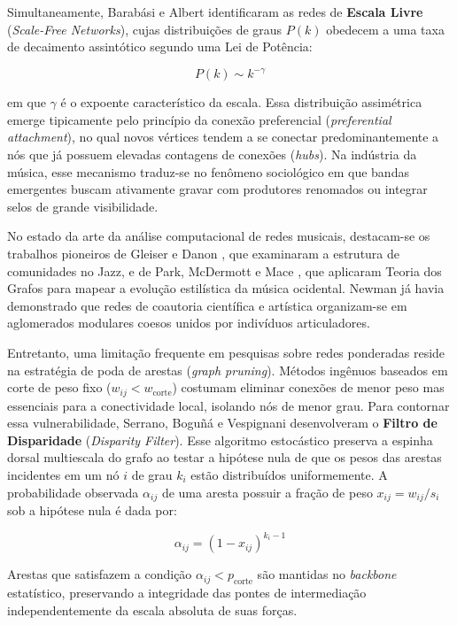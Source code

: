 \documentclass[conference]{IEEEtran}
\begin{document}
Simultaneamente, Barabási e Albert \cite{barabasi1999} identificaram as redes de \textbf{Escala Livre} (\textit{Scale-Free Networks}), cujas distribuições de graus $P(k)$ obedecem a uma taxa de decaimento assintótico segundo uma Lei de Potência:

\begin{equation}
P(k) \sim k^{-\gamma}
\end{equation}

em que $\gamma$ é o expoente característico da escala. Essa distribuição assimétrica emerge tipicamente pelo princípio da conexão preferencial (\textit{preferential attachment}), no qual novos vértices tendem a se conectar predominantemente a nós que já possuem elevadas contagens de conexões (\textit{hubs}). Na indústria da música, esse mecanismo traduz-se no fenômeno sociológico em que bandas emergentes buscam ativamente gravar com produtores renomados ou integrar selos de grande visibilidade.

No estado da arte da análise computacional de redes musicais, destacam-se os trabalhos pioneiros de Gleiser e Danon \cite{gleiser2003}, que examinaram a estrutura de comunidades no Jazz, e de Park, McDermott e Mace \cite{park2007}, que aplicaram Teoria dos Grafos para mapear a evolução estilística da música ocidental. Newman \cite{newman2001} já havia demonstrado que redes de coautoria científica e artística organizam-se em aglomerados modulares coesos unidos por indivíduos articuladores.

Entretanto, uma limitação frequente em pesquisas sobre redes ponderadas reside na estratégia de poda de arestas (\textit{graph pruning}). Métodos ingênuos baseados em corte de peso fixo ($w_{ij} < w_{\text{corte}}$) costumam eliminar conexões de menor peso mas essenciais para a conectividade local, isolando nós de menor grau. Para contornar essa vulnerabilidade, Serrano, Boguñá e Vespignani \cite{serrano2009} desenvolveram o \textbf{Filtro de Disparidade} (\textit{Disparity Filter}). Esse algoritmo estocástico preserva a espinha dorsal multiescala do grafo ao testar a hipótese nula de que os pesos das arestas incidentes em um nó $i$ de grau $k_i$ estão distribuídos uniformemente. A probabilidade observada $\alpha_{ij}$ de uma aresta possuir a fração de peso $x_{ij} = w_{ij} / s_i$ sob a hipótese nula é dada por:

\begin{equation}
\alpha_{ij} = (1 - x_{ij})^{k_i - 1}
\end{equation}

Arestas que satisfazem a condição $\alpha_{ij} < p_{\text{corte}}$ são mantidas no \textit{backbone} estatístico, preservando a integridade das pontes de intermediação independentemente da escala absoluta de suas forças.
\end{document}
